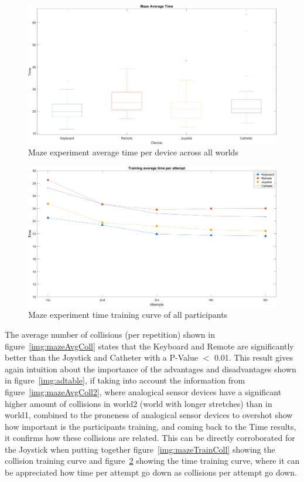 \begin{figure}[ht]
   \centering
   \includegraphics[width=1.0\textwidth]{img/maze/mazeTime.png}
   \caption{Maze experiment average time per device across all worlds}
   \label{img:mazeTime}
\end{figure}

\begin{figure}[ht]
   \centering
   \includegraphics[width=1.0\textwidth]{img/maze/mazeTrainTime.png}
   \caption{Maze experiment time training curve of all participants}
   \label{img:mazeTrainTime}
\end{figure}

The average number of collisions (per repetition) shown in figure~\ref{img:mazeAvgColl} states that the Keyboard and Remote are significantly better than the Joystick and Catheter with a P-Value $<$ 0.01. This result gives again intuition about the importance of the advantages and disadvantages shown in figure~\ref{img:adtable}, if taking into account the information from figure~\ref{img:mazeAvgColl2}, where analogical sensor devices have a significant higher amount of collisions in world2 (world with longer stretches) than in world1, combined to the proneness of analogical sensor devices to overshot show how important is the participants training, and coming back to the Time results, it confirms how these collisions are related. This can be directly corroborated for the Joystick when putting together figure~\ref{img:mazeTrainColl} showing the collision training curve and figure~\ref{img:mazeTrainTime} showing the time training curve, where it can be appreciated how time per attempt go down as collisions per attempt go down.\\

